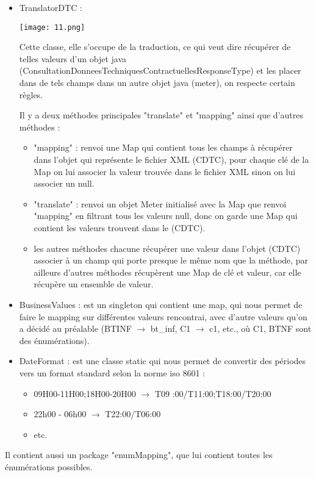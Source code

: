 \begin{itemize}
	\item TranslatorDTC : 
		\begin{center}
			\texttt{[image: 11.png]}
		\end{center}
		Cette classe, elle s’occupe de la traduction, ce qui veut dire récupérer de telles valeurs d'un objet java (ConsultationDonneesTechniquesContractuellesResponseType) et les placer dans de tels champs dans un autre objet java (meter), on respecte certain règles.
		
		
		Il y a deux méthodes principales "translate" et  "mapping" ainsi que d'autres méthodes :
		\begin{itemize}
			\item "mapping" : renvoi une Map qui contient tous les champs à récupérer dans l'objet qui représente le fichier XML (CDTC), pour chaque clé de la Map on lui associer la valeur trouvée dans le fichier XML sinon on lui associer un null.
			\item "translate" : renvoi un objet Meter initialisé avec la Map que renvoi "mapping" en filtrant tous les valeurs null, donc on garde une Map qui contient les valeurs trouvent dans le (CDTC).
			\item les autres méthodes chacune récupérer une valeur dans l'objet (CDTC) associer à un champ qui porte presque le même nom que la méthode, par ailleurs d'autres méthodes récupèrent une Map de clé et valeur, car elle récupère un ensemble de valeur.
		\end{itemize}				 
	 
	\item BusinessValues : est un singleton qui contient une map, qui nous permet de faire le mapping sur différentes valeurs rencontrai, avec d'autre valeurs qu'on a décidé au préalable (BTINF $\to$ bt{\_}inf, C1 $\to$ c1, etc., où C1, BTNF sont des énumérations).
	\item DateFormat : est une classe static qui nous permet de convertir des périodes vers un format standard selon la norme iso 8601 :
	\begin{itemize}
		\item 09H00-11H00;18H00-20H00 $\to$ T09 :00/T11:00;T18:00/T20:00
		\item 22h00 - 06h00 $\to$ T22:00/T06:00
		\item etc.
	\end{itemize} 
\end{itemize}
Il contient aussi un package "enumMapping", que lui contient toutes les énumérations possibles.
